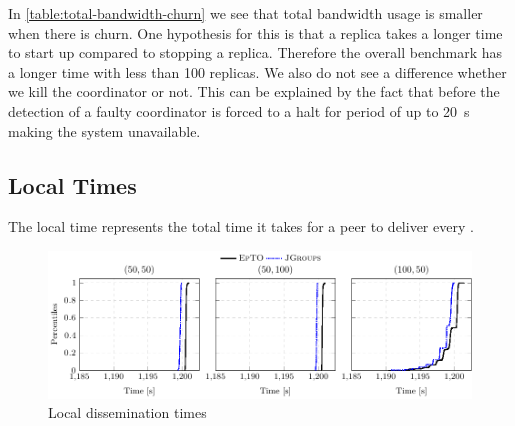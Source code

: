 \begin{table}[hpt]
	\centering
	\caption{Total \si{\giga\byte} sent/received with a synthetic churn}
	\label{table:total-bandwidth-churn} 
\end{table}
In \autoref{table:total-bandwidth-churn} we see that \jgroups total bandwidth usage is smaller when there is churn. One hypothesis for this is that a \jgroups replica takes a longer time to start up compared to stopping a replica. Therefore the overall benchmark has a longer time with less than 100 replicas. We also do not see a difference whether we kill the coordinator or not. This can be explained by the fact that before the detection of a faulty coordinator \jgroups is forced to a halt for period of up to \SI{20}{\second} making the system unavailable. 
\subsection{Local Times}
\label{sub:local-times}
The local time represents the total time it takes for a peer to deliver every .
 \begin{figure}[hpt]
 	\centering
 	\includegraphics[width=\linewidth]{figures/local-times-nochurn.pdf}
 	\vspace{-2mm} 
 	\caption{Local dissemination times}
 	\vspace{-2mm}
 	\label{fig:local-times} 
 \end{figure}

